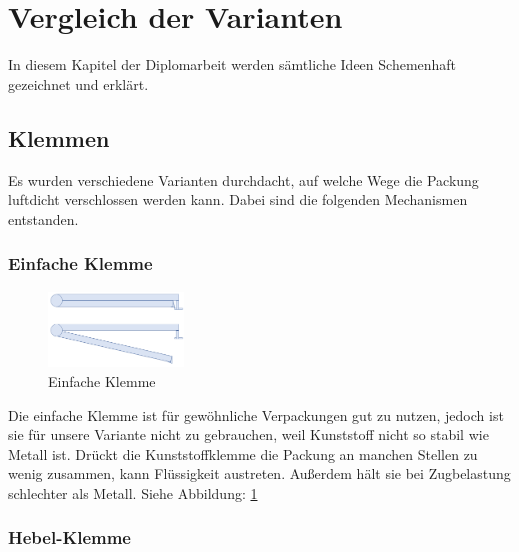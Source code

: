 \section{Vergleich der Varianten}

In diesem Kapitel der Diplomarbeit werden sämtliche Ideen Schemenhaft gezeichnet und erklärt.
 
\subsection{Klemmen}

Es wurden verschiedene Varianten durchdacht, auf welche Wege die Packung luftdicht verschlossen werden kann. Dabei sind die folgenden Mechanismen entstanden.

\subsubsection{Einfache Klemme}

\begin{figure}
\vspace{-20pt}
  \begin{center}
    \includegraphics[width=0.32\textwidth]{Bilder/Powerpoint/Einfach_Klemme}
  \end{center}
  \caption{Einfache Klemme}
  \label{Einfache Klemme}
  \vspace{-10pt}
\end{figure}

Die einfache Klemme ist für gewöhnliche Verpackungen gut zu nutzen, jedoch ist sie für unsere Variante nicht zu gebrauchen, weil Kunststoff nicht so stabil wie Metall ist. Drückt die Kunststoffklemme die Packung an manchen Stellen zu wenig zusammen, kann Flüssigkeit austreten. Außerdem hält sie bei Zugbelastung schlechter als Metall. Siehe Abbildung: \ref{Einfache Klemme}

\subsubsection{Hebel-Klemme} 

